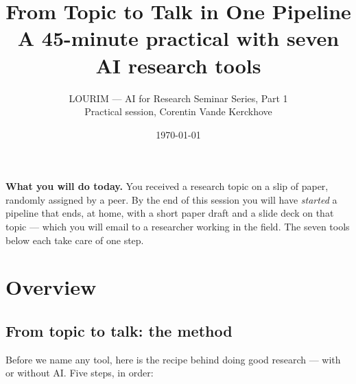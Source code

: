 \documentclass[11pt,a4paper]{article}
\title{\textbf{From Topic to Talk in One Pipeline}\\[2pt]
\large A 45-minute practical with seven AI research tools}
\author{LOURIM --- AI for Research Seminar Series, Part 1\\\small Practical session, Corentin Vande Kerckhove}
\date{\today}
\begin{document}
\maketitle

\begin{tcolorbox}[colback=accent!8, colframe=accent!50, left=10pt, right=10pt, top=6pt, bottom=6pt, boxrule=0.4pt, arc=3pt]
\textbf{What you will do today.} You received a research topic on a slip of paper, randomly assigned by a peer. By the end of this session you will have \emph{started} a pipeline that ends, at home, with a short paper draft and a slide deck on that topic --- which you will email to a researcher working in the field. The seven tools below each take care of one step.
\end{tcolorbox}

\tableofcontents
\vspace{0.5em}

\clearpage
\section{Overview}
\label{sec:overview}

\subsection{From topic to talk: the method}

Before we name any tool, here is the recipe behind doing good research --- with or without AI. Five steps, in order:
\end{document}
